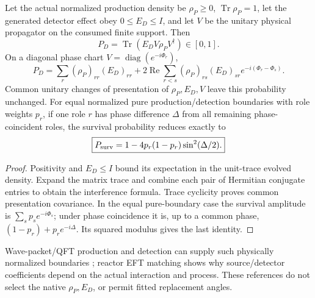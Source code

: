\documentclass[12pt,a4paper]{article}
\begin{document}
\begin{theorem}
\label{p5c:thm:v2210-lit-detector-kernel}
Let the actual normalized production density be \(\rho_P\ge0\),
\(\operatorname{Tr}\rho_P=1\), let the generated detector effect obey
\(0\le E_D\le I\), and let \(V\) be the unitary physical propagator on the
consumed finite support.  Then
\[
 \boxed{P_D=\operatorname{Tr}(E_DV\rho_PV^\dagger)\in[0,1].}
\]
On a diagonal phase chart \(V=\operatorname{diag}(e^{-i\Phi_r})\),
\[
 \boxed{P_D=\sum_r(\rho_P)_{rr}(E_D)_{rr}
 +2\operatorname{Re}\sum_{r<s}
 (\rho_P)_{rs}(E_D)_{sr}e^{-i(\Phi_r-\Phi_s)}.}
\]
Common unitary changes of presentation of \(\rho_P,E_D,V\) leave this
probability unchanged.  For equal normalized pure production/detection
boundaries with role weights \(p_r\), if one role \(r\) has phase difference
\(\Delta\) from all remaining phase-coincident roles, the survival
probability reduces exactly to
\[
 \boxed{P_{\rm surv}=1-4p_r(1-p_r)\sin^2(\Delta/2).}
\]
\end{theorem}
\begin{proof}
Positivity and \(E_D\le I\) bound its expectation in the unit-trace evolved
density.  Expand the matrix trace and combine each pair of Hermitian
conjugate entries to obtain the interference formula.  Trace cyclicity
proves common presentation covariance.  In the equal pure-boundary case
the survival amplitude is \(\sum_s p_s e^{-i\Phi_s}\); under phase
coincidence it is, up to a common phase,
\((1-p_r)+p_r e^{-i\Delta}\).  Its squared modulus gives the last identity.
\end{proof}
Wave-packet/QFT production and detection can supply such physically
normalized boundaries \cite{LitSMNeutrinoQFT2010}; reactor EFT matching
\cite{LitSMReactorEFT2019} shows why source/detector coefficients depend on
the actual interaction and process.  These references do not select the
native \(\rho_P,E_D\), or permit fitted replacement angles.
\end{document}
